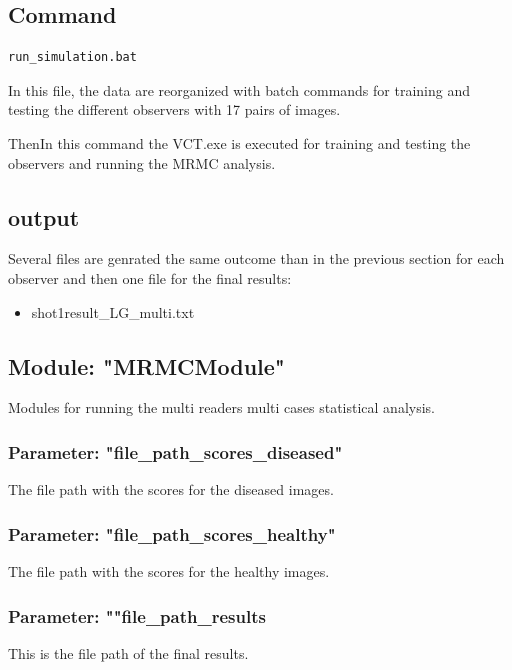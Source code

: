 \subsection{Command}

\lstset{language=C++}
\begin{lstlisting}
run_simulation.bat
\end{lstlisting}

In this file, the data are reorganized with batch commands for training and testing the different observers with 17 pairs of images.

ThenIn this command the VCT.exe is executed for training and testing the observers and running the MRMC analysis.

\subsection{output}

Several files are genrated the same outcome than in the previous section for each observer and then one file for the final results:

\begin{itemize}
\item shot1result\_LG\_multi.txt
\end{itemize}

\subsection{Module: "MRMCModule"}

Modules for running the multi readers multi cases statistical analysis.

\subsubsection{Parameter: "file\_path\_scores\_diseased"}

The file path with the scores for the diseased images.

\subsubsection{Parameter: "file\_path\_scores\_healthy"}

The file path with the scores for the healthy images.

\subsubsection{Parameter: ""file\_path\_results}

This is the file path of the final results.


